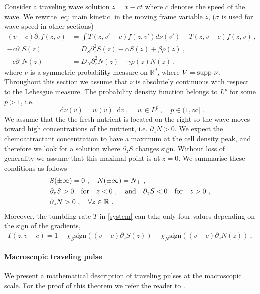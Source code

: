 \documentclass[11pt,twoside]{article}
\numberwithin{equation}{section}
\newcommand*\diff{\mathop{}\!\mathrm{d}}
\theoremstyle{plain}
\theoremstyle{nonumberplain}
\begin{document}
Consider a traveling wave solution $z=x-ct$ where $c$ denotes the speed of the wave. We rewrite \eqref{eq: main kinetic} in the moving frame variable $z$, {\color{red} ($\sigma$ is used for wave speed in other sections)}
\begin{equation}
\begin{aligned}\label{system}
(v-c)\partial_zf(z,v)&=\int T(z,v'-c)f(z,v')d\nu(v')-T(z,v-c)f(z,v)\ ,\\
-c\partial_z S(z)&=D_S\partial_{z}^2S(z)-\alpha S(z)+\beta \rho(z)\ ,\\
-c\partial_zN(z)&=D_N\partial_{z}^2N(z)-\gamma\rho(z) N(z)
\ ,
\end{aligned}
\end{equation}
where $\nu$ is a symmetric probability measure on $\mathbb{R}^d$, where $V=\textnormal{supp}\ \nu$. Throughout this section we assume that $\nu$ is absolutely continuous with respect to the Lebesgue measure. The probability density function belongs to $L^p$ for some $p > 1$, i.e.
\[
\diff \nu (v)=w(v)\diff v\ ,\ \quad w\in L^p\ , \quad p\in(1,\infty]\ .
\]
We assume that the the fresh nutrient is located on the right so the wave moves toward high concentrations of the nutrient, i.e.  $\partial_zN>0$. We expect the chemoattractant concentration to have a maximum at the cell density peak, and therefore we look for a solution where  $\partial_zS$ changes sign. Without loss of generality we assume that this maximal point is at $z=0$.  We summarise these conditions as follows
\begin{equation}
\begin{aligned}
 &S(\pm \infty)=0\ ,\quad N(\pm\infty)=N_\pm\ ,\\
&\partial_z S>0  \quad  \textrm{for}\quad z<0\ , \quad\textnormal{and}\quad\partial_z S<0 \quad \textrm{for}\quad z>0\ ,\\
&\partial_zN>0\ ,\quad\forall z\in\mathbb{R}\ .\label{eq: cond chemicals}
\end{aligned}
\end{equation}
Moreover, the tumbling rate $T$ in \eqref{system} can take only four values depending on the sign of the gradients,
\begin{eqnarray}\label{tumbl}
   T(z,v-c)=1-\chi_S \textrm{sign}((v-c)\partial_z S(z))-\chi_N \textrm{sign}((v-c)\partial_z N(z))\ ,
\end{eqnarray}

\paragraph{Macroscopic traveling pulse}
We present a mathematical description of traveling pulses at the macroscopic scale. For the proof of this theorem we refer the reader to \cite{calvez2019chemotactic}.
\end{document}
